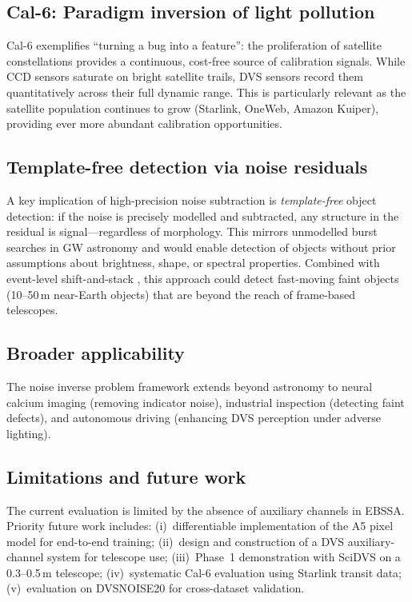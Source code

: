 \documentclass[twocolumn]{article}
\begin{document}
\subsection{Cal-6: Paradigm inversion of light pollution}

Cal-6 exemplifies ``turning a bug into a feature'': the proliferation of satellite constellations provides a continuous, cost-free source of calibration signals.
While CCD sensors saturate on bright satellite trails, DVS sensors record them quantitatively across their full dynamic range.
This is particularly relevant as the satellite population continues to grow (Starlink, OneWeb, Amazon Kuiper), providing ever more abundant calibration opportunities.

\subsection{Template-free detection via noise residuals}

A key implication of high-precision noise subtraction is \emph{template-free} object detection: if the noise is precisely modelled and subtracted, any structure in the residual is signal---regardless of morphology.
This mirrors unmodelled burst searches in GW astronomy and would enable detection of objects without prior assumptions about brightness, shape, or spectral properties.
Combined with event-level shift-and-stack \citep{Gallego2020,Stetzler2025}, this approach could detect fast-moving faint objects (10--50\,m near-Earth objects) that are beyond the reach of frame-based telescopes.

\subsection{Broader applicability}

The noise inverse problem framework extends beyond astronomy to neural calcium imaging (removing indicator noise), industrial inspection (detecting faint defects), and autonomous driving (enhancing DVS perception under adverse lighting).

\subsection{Limitations and future work}

The current evaluation is limited by the absence of auxiliary channels in EBSSA.
Priority future work includes:
(i)~differentiable implementation of the A5 pixel model for end-to-end training;
(ii)~design and construction of a DVS auxiliary-channel system for telescope use;
(iii)~Phase~1 demonstration with SciDVS \citep{A3} on a 0.3--0.5\,m telescope;
(iv)~systematic Cal-6 evaluation using Starlink transit data;
(v)~evaluation on DVSNOISE20 \citep{B3} for cross-dataset validation.
\end{document}
